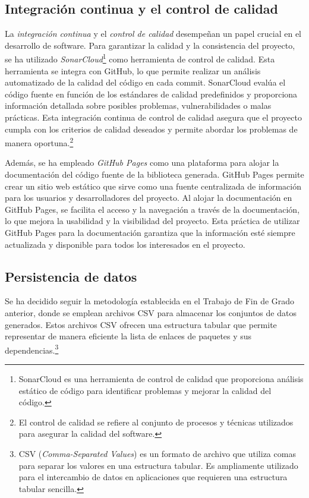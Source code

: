 \subsection{Integración continua y el control de calidad}

La \textit{integración continua} y el \textit{control de calidad} desempeñan un papel crucial en el desarrollo de software. 
Para garantizar la calidad y la consistencia del proyecto, se ha utilizado \textit{SonarCloud}\footnote{SonarCloud es una herramienta de control de calidad que proporciona 
análisis estático de código para identificar problemas y mejorar la calidad del código.} como herramienta 
de control de calidad. Esta herramienta se integra con GitHub, lo que permite realizar un análisis 
automatizado de la calidad del código en cada commit. SonarCloud evalúa el código fuente en función 
de los estándares de calidad predefinidos y proporciona información detallada sobre posibles 
problemas, vulnerabilidades o malas prácticas. Esta integración continua de control de calidad 
asegura que el proyecto cumpla con los criterios de calidad deseados y permite abordar los 
problemas de manera oportuna.\footnote{El control de calidad se refiere al conjunto de procesos y técnicas utilizados para asegurar 
la calidad del software.}

Además, se ha empleado \textit{GitHub Pages} como una plataforma para alojar la documentación del código 
fuente de la biblioteca generada. GitHub Pages permite crear un sitio web estático que sirve 
como una fuente centralizada de información para los usuarios y desarrolladores del proyecto. 
Al alojar la documentación en GitHub Pages, se facilita el acceso y la navegación a través de 
la documentación, lo que mejora la usabilidad y la visibilidad del proyecto. Esta práctica de 
utilizar GitHub Pages para la documentación garantiza que la información esté siempre actualizada 
y disponible para todos los interesados en el proyecto.

\subsection{Persistencia de datos}

Se ha decidido seguir la metodología establecida en el Trabajo de Fin de Grado anterior, donde se 
emplean archivos CSV para almacenar los conjuntos de datos generados. Estos archivos CSV ofrecen una 
estructura tabular que permite representar de manera eficiente la lista de enlaces de paquetes y sus 
dependencias.\footnote{CSV (\textit{Comma-Separated Values}) es un formato de archivo que utiliza comas para 
separar los valores en una estructura tabular. Es ampliamente utilizado para el intercambio de datos 
en aplicaciones que requieren una estructura tabular sencilla.}

